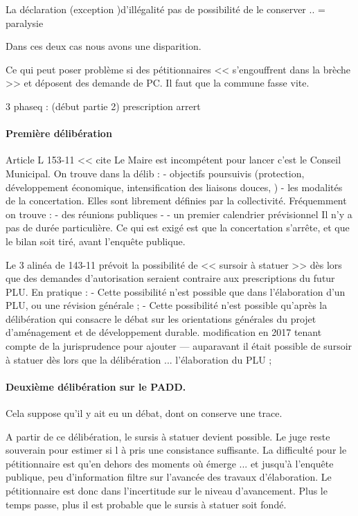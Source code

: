 			La déclaration (exception )d'illégalité pas de possibilité de le conserver .. = paralysie

			Dans ces deux cas nous avons une disparition.

			Ce qui peut poser problème si des pétitionnaires << s'engouffrent dans la brèche >> et déposent des demande de PC. Il faut que la commune fasse vite.

			3 phaseq :
			(début partie 2)
			prescription
			arrert

		\paragraph{Première délibération}

		Article L 153-11 << cite
		Le Maire est incompétent pour lancer c'est le Conseil Municipal. On trouve dans la délib :
		 - objectifs poursuivis (protection, développement économique, intensification des liaisons douces, \etc)
		 - les modalités de la concertation. Elles sont librement définies par la collectivité. Fréquemment on trouve :
		 	- des réunions publiques
		 	-
		 	- un premier calendrier prévisionnel
		Il n'y a pas  de durée particulière. Ce qui est exigé est que la concertation s'arrête, et que le bilan soit tiré, avant l'enquête publique.

		Le 3\ieme{} alinéa de 143-11 prévoit la possibilité de << sursoir à statuer >> dès lors que des demandes d'autorisation seraient contraire aux prescriptions du futur PLU. En pratique :
			- Cette possibilité n'est possible que dans l'élaboration d'un PLU, ou une révision générale ;
			- Cette possibilité n'est possible qu'après la délibération qui consacre le débat sur les orientations générales du projet d'aménagement et de développement durable. modification en 2017 tenant compte de la jurisprudence pour ajouter --- auparavant il était possible de sursoir à statuer dès lors que la délibération ... l'élaboration du PLU ;

		\paragraph{Deuxième délibération sur le PADD.}

		Cela suppose qu'il y ait eu un débat, dont on conserve une trace.

		A partir de ce délibération, le sursis à statuer devient possible. Le juge reste souverain pour estimer si l à pris une consistance suffisante. La difficulté pour le pétitionnaire est qu'en dehors des moments où émerge ... et jusqu'à l'enquête publique, peu d'information filtre sur l'avancée des travaux d'élaboration. Le pétitionnaire est donc dans l'incertitude sur le niveau d'avancement. Plus le temps passe, plus il est probable que le sursis à statuer soit fondé.

